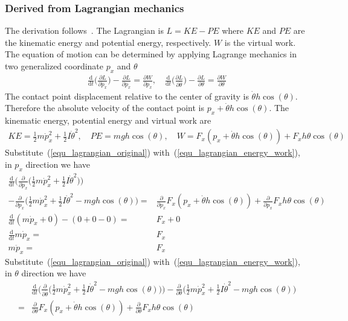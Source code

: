 \documentclass[12pt]{article}
\begin{document}
\subsubsection{Derived from Lagrangian mechanics}
The derivation follows~\cite{peacock_2007_mit_lagrange}.
The Lagrangian is $L=KE-PE$ where $KE$ and $PE$ are the
kinematic energy and potential energy, respectively.
$W$ is the virtual work.
The equation of motion can be determined by applying
Lagrange mechanics in two generalized coordinate $p_x$ and $\theta$
\begin{align}
\label{equ_lagrangian_original}
\frac{\mathrm{d}}{\mathrm{d}t}\bigg(
\frac{\partial L}{\partial \dot{p}_x}\bigg)
-\frac{\partial L}{\partial p_x}=
\frac{\partial W}{\partial p_x}, \quad
\frac{\mathrm{d}}{\mathrm{d}t}\bigg(
\frac{\partial L}{\partial \dot{\theta}}\bigg)
-\frac{\partial L}{\partial \theta}=
\frac{\partial W}{\partial \theta}
\end{align}
The contact point displacement relative to the center of gravity is
$\dot{\theta}h\cos(\theta)$. Therefore the absolute velocity of
the contact point is $p_x + \dot{\theta}h\cos(\theta)$.
The kinematic energy, potential energy and virtual work are
\begin{align}
KE = \frac{1}{2}m\dot{p}_x^2
+\frac{1}{2}I\dot{\theta}^2,\quad
PE = mgh\cos(\theta), \quad
W = F_x (p_x+ \dot{\theta}h\cos(\theta)) + F_x h \theta \cos(\theta)
\label{equ_lagrangian_energy_work}
\end{align}
Substitute~(\ref{equ_lagrangian_original})
with~(\ref{equ_lagrangian_energy_work}), in $p_x$ direction we have
\begin{align}
\frac{\mathrm{d}}{\mathrm{d}t}\bigg(
\frac{\partial}{\partial \dot{p}_x}\bigg(
\frac{1}{2}m\dot{p}_x^2 + \frac{1}{2}I\dot{\theta}^2\bigg)\bigg) \quad &\\
-\frac{\partial}{\partial p_x}\bigg(
\frac{1}{2}m\dot{p}_x^2+\frac{1}{2}I\dot{\theta}^2
-mgh\cos(\theta)\bigg)=&
\frac{\partial}{\partial p_x}F_x (p_x+ \dot{\theta}h\cos(\theta))
+\frac{\partial}{\partial p_x} F_x h \theta \cos(\theta) \\
\frac{\mathrm{d}}{\mathrm{d}t}
(m\dot{p}_x + 0)
-(0+0-0)=&
F_x + 0\\
\frac{\mathrm{d}}{\mathrm{d}t}
m\dot{p}_x = & F_x \\
m\ddot{p}_x =& F_x
\end{align}
Substitute~(\ref{equ_lagrangian_original})
with~(\ref{equ_lagrangian_energy_work}), in $\theta$ direction we have
\begin{align}
&\frac{\mathrm{d}}{\mathrm{d}t}\bigg(
\frac{\partial}{\partial\dot{\theta}}\bigg(
\frac{1}{2}m\dot{p}_x^2+\frac{1}{2}I\dot{\theta}^2
-mgh\cos(\theta)\bigg)\bigg)
-\frac{\partial}{\partial \theta}\bigg(
\frac{1}{2}m\dot{p}_x^2+\frac{1}{2}I\dot{\theta}^2
-mgh\cos(\theta)\bigg)  \\
=&\frac{\partial}{\partial \theta}F_x (p_x+ \dot{\theta}h\cos(\theta))
+\frac{\partial}{\partial \theta} F_x h \theta \cos(\theta) 
\end{align}
\end{document}

